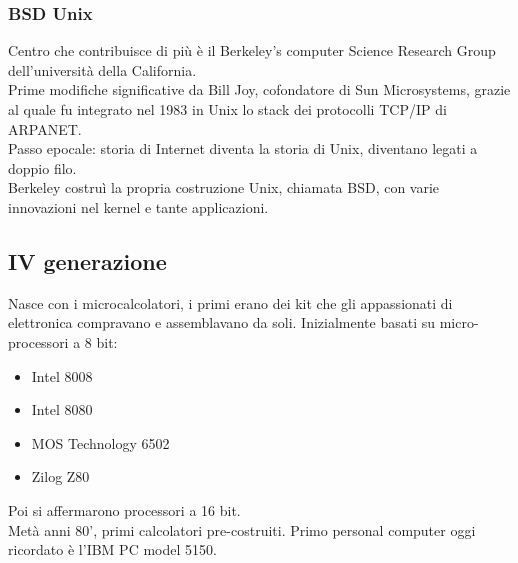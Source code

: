 \documentclass[12pt, oneside]{extbook}
\begin{document}
\subsubsection{BSD Unix}
Centro che contribuisce di più è il Berkeley's computer Science Research Group dell'università della California.\\ Prime modifiche significative da Bill Joy, cofondatore di Sun Microsystems, grazie al quale fu integrato nel 1983 in Unix lo stack dei protocolli TCP/IP di ARPANET.\\ Passo epocale: storia di Internet diventa la storia di Unix, diventano legati a doppio filo.\\ Berkeley costruì la propria costruzione Unix, chiamata BSD, con varie innovazioni nel kernel e tante applicazioni.
\subsection{IV generazione}
Nasce con i microcalcolatori, i primi erano dei kit che gli appassionati di elettronica compravano e assemblavano da soli. Inizialmente basati su micro-processori a 8 bit:
\begin{itemize}
\item Intel 8008
\item Intel 8080
\item MOS Technology 6502
\item Zilog Z80
\end{itemize}
Poi si affermarono processori a 16 bit.\\ Metà anni 80', primi calcolatori pre-costruiti. Primo personal computer oggi ricordato è l'IBM PC model 5150.
\end{document}

